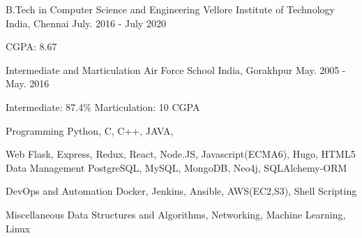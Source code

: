 \documentclass[11pt, a4paper]{awesome-cv}
\begin{document}
\begin{cventries}

  \cventry
    {B.Tech in Computer Science and Engineering} %
    {Vellore Institute of Technology} %
    {India, Chennai} %
    {July. 2016 - July 2020} %
    {
      \begin{cvitems} %
        \item {CGPA: 8.67}
      \end{cvitems}
    }

  \cventry
    {Intermediate and Marticulation} %
    {Air Force School} %
    {India, Gorakhpur} %
    {May. 2005 - May. 2016} %
    {
      \begin{cvitems} %
        \item {Intermediate: 87.4\%  \hspace{1cm} Marticulation: 10 CGPA}
      \end{cvitems}
    }

\end{cventries}



\begin{cvskills}

  \cvskill
    {Programming} %
    {Python, C, C++, JAVA, } %

  \cvskill
    {Web} %
    {Flask, Express, Redux, React, Node.JS, Javascript(ECMA6), Hugo, HTML5} %
    \cvskill
    {Data Management} %
    {PostgreSQL, MySQL, MongoDB, Neo4j, SQLAlchemy-ORM} %

  \cvskill
    {DevOps and Automation} %
    {Docker, Jenkins, Ansible, AWS(EC2,S3), Shell Scripting} %

    \cvskill
    {Miscellaneous} %
    {Data Structures and Algorithms, Networking, Machine Learning, Linux} %

\end{cvskills}
\end{document}

